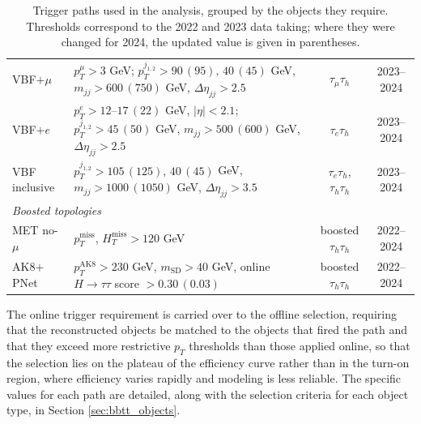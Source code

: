 \begin{table}[t]
\begin{tabular}{l p{5.4cm} c c}
\quad VBF$+\mu$ & $p_{T}^{\mu} > 3$ GeV; $p_{T}^{j_{1,2}} > 90\,(95),\,40\,(45)$ GeV, $m_{jj} > 600\,(750)$ GeV, $\Delta\eta_{jj} > 2.5$ & $\tau_\mu\tau_h$ & 2023--2024 \\
\quad VBF$+e$ & $p_{T}^{e} > 12$--$17\,(22)$ GeV, $|\eta| < 2.1$; $p_{T}^{j_{1,2}} > 45\,(50)$ GeV, $m_{jj} > 500\,(600)$ GeV, $\Delta\eta_{jj} > 2.5$ & $\tau_e\tau_h$ & 2023--2024 \\
\quad VBF inclusive & $p_{T}^{j_{1,2}} > 105\,(125),\,40\,(45)$ GeV, $m_{jj} > 1000\,(1050)$ GeV, $\Delta\eta_{jj} > 3.5$ & $\tau_e\tau_h$, $\tau_h\tau_h$ & 2023--2024 \\
\midrule
\multicolumn{4}{l}{\textit{Boosted topologies}} \\
\midrule
\quad MET no-$\mu$ & $p_{T}^{\text{miss}}$, $H_{T}^{\text{miss}} > 120$ GeV & boosted $\tau_h\tau_h$ & 2022--2024 \\
\quad AK8$+$PNet & $p_{T}^{\text{AK8}} > 230$ GeV, $m_{\text{SD}} > 40$ GeV, online $H\to\tau\tau$ score $> 0.30\,(0.03)$ & boosted $\tau_h\tau_h$ & 2022--2024 \\
\bottomrule
\end{tabular}
\caption[Trigger paths used in the analysis]{%
  Trigger paths used in the analysis, grouped by the objects they require. Thresholds
  correspond to the 2022 and 2023 data taking; where they were changed for 2024, the
  updated value is given in parentheses.}
\label{tab:triggers}
\end{table}

The online trigger requirement is carried over to the offline selection, requiring that the reconstructed objects be matched to the objects that fired the path and that they exceed more restrictive $p_T$ thresholds than those applied online, so that the selection lies on the plateau of the efficiency curve rather than in the turn-on region, where efficiency varies rapidly and modeling is less reliable. The specific values for each path are detailed, along with the selection criteria for each object type, in Section \ref{sec:bbtt_objects}.

